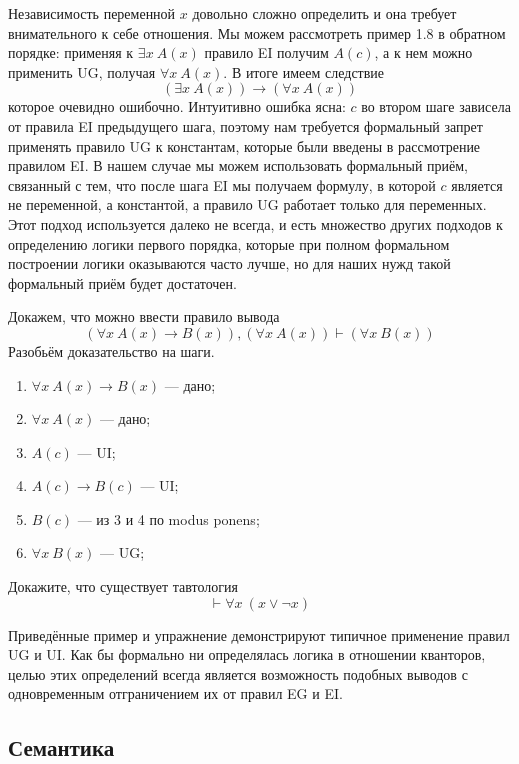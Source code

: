 Независимость переменной $x$ довольно сложно определить и она требует внимательного к себе отношения. Мы можем рассмотреть пример 1.8 в обратном порядке: применяя к $\exists x \ A(x)$ правило EI получим $A(c)$, а к нем можно применить UG, получая $\forall x\ A(x)$. В итоге имеем следствие
$$(\exists x\ A(x)) \to (\forall x\ A(x))$$
которое очевидно ошибочно. Интуитивно ошибка ясна: $c$ во втором шаге зависела от правила EI предыдущего шага, поэтому нам требуется формальный запрет применять правило UG к константам, которые были введены в рассмотрение правилом EI. В нашем случае мы можем использовать формальный приём, связанный с тем, что после шага EI мы получаем формулу, в которой $c$ является не переменной, а константой, а правило UG работает только для переменных. Этот подход используется далеко не всегда, и есть множество других подходов к определению логики первого порядка, которые при полном формальном построении логики оказываются часто лучше, но для наших нужд такой формальный приём будет достаточен.

\begin{example}
Докажем, что можно ввести правило вывода $$(\forall x\ A(x)\to B(x)), (\forall x\ A(x)) \vdash (\forall x\ B(x))$$
Разобьём доказательство на шаги.
\begin{enumerate}
\item $\forall x\ A(x) \to B(x)$ --- дано;
\item $\forall x\ A(x)$ --- дано;
\item $A(c)$ --- UI;
\item $A(c) \to B(c)$ --- UI;
\item $B(c)$ --- из 3 и 4 по modus ponens;
\item $\forall x\ B(x)$ --- UG;
\end{enumerate}
\end{example}

\begin{exercise}
Докажите, что существует тавтология $$\vdash \forall x\ (x\lor\neg x)$$
\end{exercise}

Приведённые пример и упражнение демонстрируют типичное применение правил UG и UI. Как бы формально ни определялась логика в отношении кванторов, целью этих определений всегда является возможность подобных выводов с одновременным отграничением их от правил EG и EI.

\subsection{Семантика}

